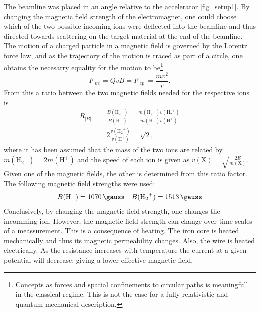 The beamline was placed in an angle relative to the accelerator
\cref{fig_setup1}. By changing the magnetic field strength of the
electromagnet, one could choose which of the two possible incoming ions were
deflected into the beamline and thus directed towards scattering on the target material at the end of the beamline. 
The motion of a charged particle in a magnetic field is governed by the Lorentz
force law, and as the trajectory of the motion is traced as part of a circle,
one obtains the necesarry equality for the motion to be\footnote{Concepts as
forces and spatial confinements to circular paths is meaningfull in the
classical regime. This is not the case for a fully relativistic and quantum
mechanical description.}
\begin{equation}
F_|m| = QvB = F_|cp| = \frac{mv^2}{r}.
\end{equation}
From this a ratio between the two magnetic fields needed for the respective
ions is
\begin{align}
    R_|B| = & \frac{B({\mathrm{H_2}^+})}{B(\mathrm{H^+})} =
    \frac{m({\mathrm{H_2}^+})
    v({\mathrm{H_2}^+})}{m(\mathrm{H^+})v(\mathrm{H^+})}\\
    & 2 \frac{v({\mathrm{H_2}^+})}{v(\mathrm{H^+})} = \sqrt{2},
\end{align}
%
where it has been assumed that the mass of the two ions are related by
$m(\mathrm{{H_2}^+}) = 2m(\mathrm{H^+}) $ and the speed of each ion is given as
$v(\mathrm{X}) = \sqrt{\frac{2E}{m(\mathrm{X})}}$.
%
Given one of the magnetic fields, the other is determined from this ratio
factor. The following magnetic field strengths were used:
\begin{equation}
    B(\mathrm{H^+}) = \SI{1070}{\gauss} \quad B(\mathrm{{H_2}^+}) = \SI{1513}{\gauss}
\end{equation}
Conclusively, by changing the magnetic field strength, one changes the
incomming ion. However, the magnetic field strength can change over time scales
of a meassurement. This is a consequence of heating. The iron core is heated
mechanically and thus its magnetic permeability changes. Also, the wire is
heated electrically. As the resistance increases with temperature the
current at a given potential will decrease; giving a lower effective magnetic
field.

